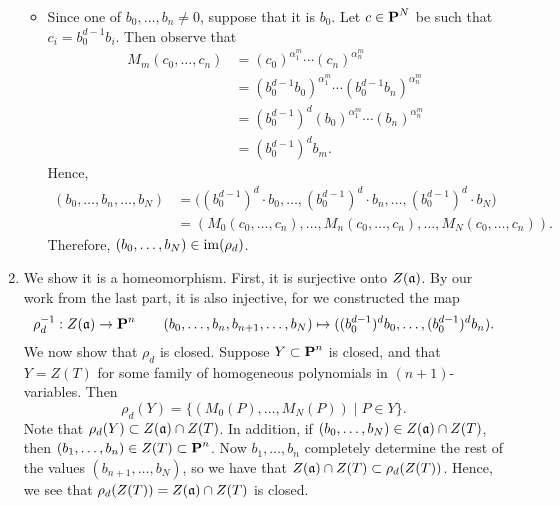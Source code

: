 \documentclass[10pt]{amsart}
\begin{document}
\begin{solution}
\begin{luke}
\begin{enumerate}
\begin{itemize}
                \item Since one of $b_0, \dots, b_n \ne 0$, suppose that it is $b_0$. 
                Let $c \in \operatorname{\mathbf{P}}^N$ be such that $c_i = b_0^{d-1}b_i$. 
                Then observe that 
                \begin{align*}
                    M_m(c_0, \dots, c_n) 
                    &= (c_0)^{\alpha_1^{m}} \cdots (c_n)^{\alpha_n^{m}}\\
                    &= (b_0^{d-1} b_0)^{\alpha_1^{m}} \cdots (b_0^{d-1} b_n)^{\alpha_n^{m}}\\
                    &= (b_0^{d-1})^{d}(b_0)^{\alpha_1^m} \cdots(b_n)^{\alpha_n^m} \\
                    &= (b_0^{d-1})^d b_m.
                \end{align*}
                Hence,
                \begin{align*}
                    (b_0, \dots, b_n, \dots, b_N) 
                    &=
                    \big((b_0^{d-1})^{d}\cdot b_0, \dots, (b_0^{d-1})^{d} \cdot b_n, \dots, (b_0^{d-1})^{d} \cdot b_N\big)\\
                    &=
                    (M_0(c_0, \dots, c_n), \dots, M_n(c_0, \dots, c_n), \dots, M_N(c_0, \dots, c_n)).
                \end{align*}
                Therefore, $(b_0, \dots, b_N) \in \operatorname{im}(\rho_d)$. 
    
            \end{itemize}
            
        \item We show it is a homeomorphism. First, it is surjective onto $Z(\mathfrak{a})$. 
        By our work from the last part, it is also injective, for we constructed the map 
        \[
            \rho_d^{-1}: Z(\mathfrak{a}) \to \operatorname{\mathbf{P}}^n \qquad (b_0, \dots, b_n, b_{n+1}, \dots, b_N) \mapsto ((b_0^{d-1})^d b_0, \dots, (b_0^{d-1})^d b_n).
        \]
        We now show that $\rho_d$ is closed. Suppose $Y \subset \operatorname{\mathbf{P}}^n$ is closed, and that 
        $Y = Z(T)$ for some family of homogeneous polynomials in $(n+1)$-variables. 
        Then 
        \[
            \rho_d(Y) = \bigg\{ (M_0(P), \dots, M_N(P)) \;\bigg|\; P \in Y \bigg\}.
        \]
        Note that $\rho_d(Y) \subset Z(\mathfrak{a})\cap Z(T)$. In addition, if $(b_0, \dots, b_N) \in Z(\mathfrak{a}) \cap Z(T)$, 
        then $(b_1, \dots, b_n) \in Z(T) \subset \operatorname{\mathbf{P}}^n$. Now $b_1, \dots, b_n$ completely 
        determine the rest of the values $(b_{n+1}, \dots, b_N)$, so we have that 
        $Z(\mathfrak{a}) \cap Z(T) \subset \rho_d(Z(T))$. Hence, we see that $\rho_d(Z(T)) = Z(\mathfrak{a})\cap Z(T)$ is closed. 


\end{enumerate}
\end{luke}
\end{solution}
\end{document}
